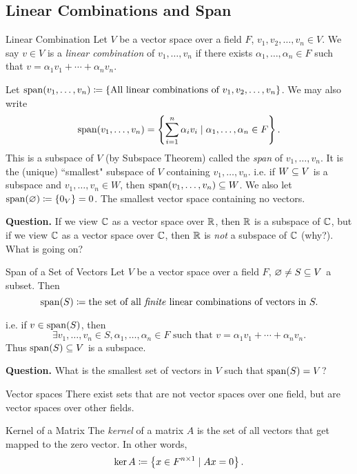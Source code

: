 \documentclass[class=article, crop=false]{standalone}
\begin{document}
  \subsection{Linear Combinations and Span}
  \begin{definition}{Linear Combination}
    Let $V$ be a vector space over a field $F$, $v_1, v_2, \dotsc, v_n \in V$. We say $v\in V$ is a \emph{linear combination} of $v_1, \dotsc, v_n$ if there exists $\alpha_1, \dotsc, \alpha_n\in F$ such that $v = \alpha_1v_1 + \dotsb + \alpha_nv_n$.
  \end{definition}
  Let $\operatorname{span}(v_1,\dotsc,v_n)\coloneqq\left\{\text{All linear combinations of }v_1, v_2, \dotsc, v_n\right\}$. We may also write
  \[
    \operatorname{span}(v_1,\dotsc,v_n) = \left\{\sum_{i=1}^{n}\alpha_iv_i\mid \alpha_1, \dotsc, \alpha_n \in F\right\}.
  \]
  This is a subspace of $V$ (by Subspace Theorem) called the \emph{span} of $v_1, \dotsc, v_n$. It is the (unique) ``smallest" subspace of $V$ containing $v_1, \dotsc, v_n$. i.e. if $W \subseteq V$ is a subspace and $v_1, \dotsc, v_n \in W$, then $\operatorname{span}(v_1,\dotsc, v_n)\subseteq W$. We also let $\operatorname{span}(\varnothing) \coloneqq \left\{0_V\right\} = 0$. The smallest vector space containing no vectors. \par
  \textbf{Question.} If we view $\mathbb{C}$ as a vector space over $\mathbb{R}$, then $\mathbb{R}$ is a subspace of $\mathbb{C}$, but if we view $\mathbb{C}$ as a vector space over $\mathbb{C}$, then $\mathbb{R}$ is \emph{not} a subspace of $\mathbb{C}$ (why?). What is going on?
  \begin{definition}{Span of a Set of Vectors}
    Let $V$ be a vector space over a field $F$, $\varnothing \neq S \subseteq V$ a subset. Then
    \[
      \operatorname{span}(S) \coloneqq \text{the set of all \emph{finite} linear combinations of vectors in }S.
    \]
  \end{definition}
  i.e. if $v\in \operatorname{span}(S)$, then
  \[
  \exists v_1, \dotsc, v_n\in S, \alpha_1, \dotsc, \alpha_n \in F \text{ such that } v = \alpha_1v_1 + \dotsb + \alpha_nv_n.
  \]
  Thus $\operatorname{span}(S)\subseteq V$ is a subspace. \par
  \textbf{Question.} What is the smallest set of vectors in $V$ such that $\operatorname{span}(S) = V$?
  \begin{note}{Vector spaces}
    There exist sets that are not vector spaces over one field, but are vector spaces over other fields.
  \end{note}
  \begin{definition}{Kernel of a Matrix}
    The \emph{kernel} of a matrix $A$ is the set of all vectors that get mapped to the zero vector. In other words,
    \[
      \ker A \coloneqq \left\{x\in F^{n\times1}\mid Ax = 0\right\}.
    \]
  \end{definition}
\end{document}
